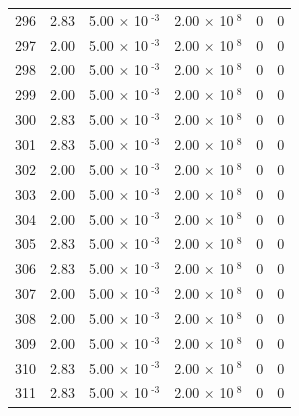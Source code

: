 \documentclass[a4paper,11pt]{article}
\begin{document}
\begin{center}
\begin{longtable}{|R{1.5cm}|R{2.4cm}|R{2.4cm}|R{2.4cm}|R{2.4cm}|R{2.4cm}|}
  296 &   2.83  &         5.00 $\times$ 10$^{\text{          -3}}$  &         2.00 $\times$ 10$^{\text{           8}}$  & 0  & 0 \\
  297 &   2.00  &         5.00 $\times$ 10$^{\text{          -3}}$  &         2.00 $\times$ 10$^{\text{           8}}$  & 0  & 0 \\
  298 &   2.00  &         5.00 $\times$ 10$^{\text{          -3}}$  &         2.00 $\times$ 10$^{\text{           8}}$  & 0  & 0 \\
  299 &   2.00  &         5.00 $\times$ 10$^{\text{          -3}}$  &         2.00 $\times$ 10$^{\text{           8}}$  & 0  & 0 \\
  300 &   2.83  &         5.00 $\times$ 10$^{\text{          -3}}$  &         2.00 $\times$ 10$^{\text{           8}}$  & 0  & 0 \\
  301 &   2.83  &         5.00 $\times$ 10$^{\text{          -3}}$  &         2.00 $\times$ 10$^{\text{           8}}$  & 0  & 0 \\
  302 &   2.00  &         5.00 $\times$ 10$^{\text{          -3}}$  &         2.00 $\times$ 10$^{\text{           8}}$  & 0  & 0 \\
  303 &   2.00  &         5.00 $\times$ 10$^{\text{          -3}}$  &         2.00 $\times$ 10$^{\text{           8}}$  & 0  & 0 \\
  304 &   2.00  &         5.00 $\times$ 10$^{\text{          -3}}$  &         2.00 $\times$ 10$^{\text{           8}}$  & 0  & 0 \\
  305 &   2.83  &         5.00 $\times$ 10$^{\text{          -3}}$  &         2.00 $\times$ 10$^{\text{           8}}$  & 0  & 0 \\
  306 &   2.83  &         5.00 $\times$ 10$^{\text{          -3}}$  &         2.00 $\times$ 10$^{\text{           8}}$  & 0  & 0 \\
  307 &   2.00  &         5.00 $\times$ 10$^{\text{          -3}}$  &         2.00 $\times$ 10$^{\text{           8}}$  & 0  & 0 \\
  308 &   2.00  &         5.00 $\times$ 10$^{\text{          -3}}$  &         2.00 $\times$ 10$^{\text{           8}}$  & 0  & 0 \\
  309 &   2.00  &         5.00 $\times$ 10$^{\text{          -3}}$  &         2.00 $\times$ 10$^{\text{           8}}$  & 0  & 0 \\
  310 &   2.83  &         5.00 $\times$ 10$^{\text{          -3}}$  &         2.00 $\times$ 10$^{\text{           8}}$  & 0  & 0 \\
  311 &   2.83  &         5.00 $\times$ 10$^{\text{          -3}}$  &         2.00 $\times$ 10$^{\text{           8}}$  & 0  & 0 \\

\end{longtable}
\end{center}
\end{document}
